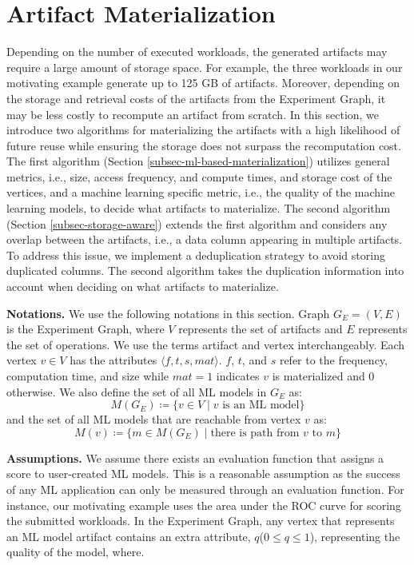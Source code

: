 \section{Artifact Materialization}\label{sec-materialization}
Depending on the number of executed workloads, the generated artifacts may require a large amount of storage space.
For example, the three workloads in our motivating example generate up to 125 GB of artifacts.
Moreover, depending on the storage and retrieval costs of the artifacts from the Experiment Graph, it may be less costly to recompute an artifact from scratch.
In this section, we introduce two algorithms for materializing the artifacts with a high likelihood of future reuse while ensuring the storage does not surpass the recomputation cost.
The first algorithm (Section \ref{subsec-ml-based-materialization}) utilizes general metrics, i.e., size, access frequency, and compute times, and storage cost of the vertices, and a machine learning specific metric, i.e., the quality of the machine learning models, to decide what artifacts to materialize.
The second algorithm (Section \ref{subsec-storage-aware}) extends the first algorithm and considers any overlap between the artifacts, i.e., a data column appearing in multiple artifacts.
To address this issue, we implement a deduplication strategy to avoid storing duplicated columns.
The second algorithm takes the duplication information into account when deciding on what artifacts to materialize.

\textbf{Notations. }
We use the following notations in this section.
Graph $G_E = (V,E)$ is the Experiment Graph, where $V$ represents the set of artifacts and $E$ represents the set of operations.
We use the terms artifact and vertex interchangeably.
Each vertex $v \in V$ has the attributes $\langle f, t, s, mat \rangle$.
$f$, $t$, and $s$ refer to the frequency, computation time, and size while $mat=1$ indicates $v$ is materialized and $0$ otherwise.
We also define the set of all ML models in $G_E$ as:
\[
M(G_E) \coloneqq  \{v \in V \mid v \text{ is an ML model}\}
\] 
and the set of all ML models that are reachable from vertex $v$ as:
\[
M(v) \coloneqq  \{m \in M(G_E) \mid\text{there is path from } v \text{ to } m\}
\] 

\textbf{Assumptions. }
We assume there exists an evaluation function that assigns a score to user-created ML models.
This is a reasonable assumption as the success of any ML application can only be measured through an evaluation function.
For instance, our motivating example uses the area under the ROC curve for scoring the submitted workloads.
In the Experiment Graph, any vertex that represents an ML model artifact contains an extra attribute, $q$($0 \leq q \leq 1$), representing the quality of the model, where.
